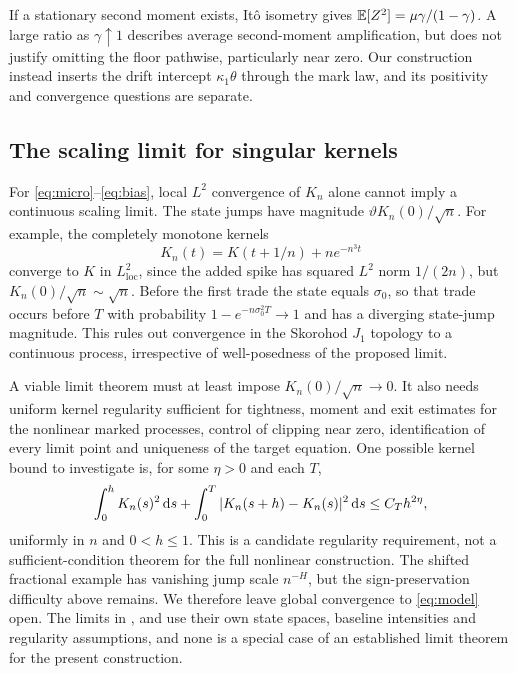 If a stationary second moment exists, It\^o isometry gives $\mathbb{E}[Z^2]=\mu\gamma/(1-\gamma)$. A large ratio as $\gamma\uparrow1$ describes average second-moment amplification, but does not justify omitting the floor pathwise, particularly near zero. Our construction instead inserts the drift intercept $\kappa_1\theta$ through the mark law, and its positivity and convergence questions are separate.

\subsection{The scaling limit for singular kernels}\label{sec:micro_limit}

\begin{remark}\label{conj:limit}
For \eqref{eq:micro}--\eqref{eq:bias}, local $L^2$ convergence of $K_n$ alone cannot imply a continuous scaling limit. The state jumps have magnitude $\vartheta K_n(0)/\sqrt n$. For example, the completely monotone kernels
\begin{equation*}
K_n(t)=K(t+1/n)+n e^{-n^3t}
\end{equation*}
converge to $K$ in $L^2_{\mathrm{loc}}$, since the added spike has squared $L^2$ norm $1/(2n)$, but $K_n(0)/\sqrt n\sim\sqrt n$. Before the first trade the state equals $\sigma_0$, so that trade occurs before $T$ with probability $1-e^{-n\sigma_0^2T}\to1$ and has a diverging state-jump magnitude. This rules out convergence in the Skorohod $J_1$ topology to a continuous process, irrespective of well-posedness of the proposed limit.
\end{remark}

A viable limit theorem must at least impose $K_n(0)/\sqrt n\to0$. It also needs uniform kernel regularity sufficient for tightness, moment and exit estimates for the nonlinear marked processes, control of clipping near zero, identification of every limit point and uniqueness of the target equation. One possible kernel bound to investigate is, for some $\eta>0$ and each $T$,
\begin{equation*}
\int_0^h K_n(s)^2\,\mathrm{d} s+\int_0^T|K_n(s+h)-K_n(s)|^2\,\mathrm{d} s\le C_T h^{2\eta},
\end{equation*}
uniformly in $n$ and $0<h\le1$. This is a candidate regularity requirement, not a sufficient-condition theorem for the full nonlinear construction. The shifted fractional example has vanishing jump scale $n^{-H}$, but the sign-preservation difficulty above remains. We therefore leave global convergence to \eqref{eq:model} open. The limits in \citet{DandapaniJusselinRosenbaum2021}, \citet{HorstXuZhang2024} and \citet{HagerHorstWagenhoferXu2026} use their own state spaces, baseline intensities and regularity assumptions, and none is a special case of an established limit theorem for the present construction.

